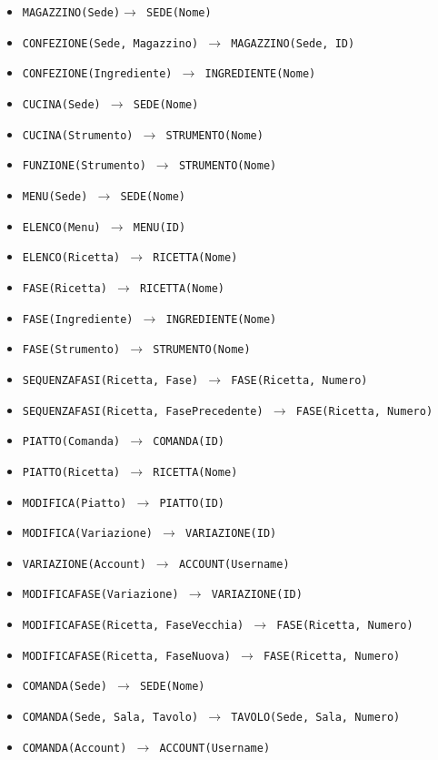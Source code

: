 \begin{itemize}[parsep=0pt,listparindent=9\parindent]
    \item\tt MAGAZZINO(Sede)$\rightarrow$ SEDE(Nome)
    \item\tt CONFEZIONE(Sede, Magazzino) $\rightarrow$ MAGAZZINO(Sede, ID)
    \item\tt CONFEZIONE(Ingrediente) $\rightarrow$ INGREDIENTE(Nome)
    \item\tt CUCINA(Sede) $\rightarrow$ SEDE(Nome)
    \item\tt CUCINA(Strumento) $\rightarrow$ STRUMENTO(Nome)
    \item\tt FUNZIONE(Strumento) $\rightarrow$ STRUMENTO(Nome)
    \item\tt MENU(Sede) $\rightarrow$ SEDE(Nome)
    \item\tt ELENCO(Menu) $\rightarrow$ MENU(ID)
    \item\tt ELENCO(Ricetta) $\rightarrow$ RICETTA(Nome)
    \item\tt FASE(Ricetta) $\rightarrow$ RICETTA(Nome)
    \item\tt FASE(Ingrediente) $\rightarrow$ INGREDIENTE(Nome)
    \item\tt FASE(Strumento) $\rightarrow$ STRUMENTO(Nome)
    \item\tt SEQUENZAFASI(Ricetta, Fase) $\rightarrow$ FASE(Ricetta, Numero)
    \item\tt SEQUENZAFASI(Ricetta, FasePrecedente) $\rightarrow$ FASE(Ricetta, Numero)
    \item\tt PIATTO(Comanda) $\rightarrow$ COMANDA(ID)
    \item\tt PIATTO(Ricetta) $\rightarrow$ RICETTA(Nome)
    \item\tt MODIFICA(Piatto) $\rightarrow$ PIATTO(ID)
    \item\tt MODIFICA(Variazione) $\rightarrow$ VARIAZIONE(ID)
    \item\tt VARIAZIONE(Account) $\rightarrow$ ACCOUNT(Username)
    \item\tt MODIFICAFASE(Variazione) $\rightarrow$ VARIAZIONE(ID)
    \item\tt MODIFICAFASE(Ricetta, FaseVecchia) $\rightarrow$ FASE(Ricetta, Numero)
    \item\tt MODIFICAFASE(Ricetta, FaseNuova) $\rightarrow$ FASE(Ricetta, Numero)
    \item\tt COMANDA(Sede) $\rightarrow$ SEDE(Nome)
    \item\tt COMANDA(Sede, Sala, Tavolo) $\rightarrow$ TAVOLO(Sede, Sala, Numero)
    \item\tt COMANDA(Account) $\rightarrow$ ACCOUNT(Username)

\end{itemize}
